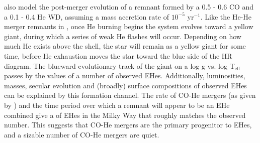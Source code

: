 
\cite{saioj02} also model the post-merger evolution of a remnant formed by a 0.5 - 0.6 {\Msun} CO and a 0.1 - 0.4 {\Msun} He WD, assuming a mass accretion rate of $10^{-5}$ {\Msun} yr$^{-1}$.  Like the He-He merger remnants in \cite{saioj00}, once He burning begins the system evolves toward a yellow giant, during which a series of weak He flashes will occur.  Depending on how much He exists above the shell, the star will remain as a yellow giant for some time, before He exhaustion moves the star toward the blue side of the HR diagram.  The blueward evolutionary track of the giant on a log g vs. log T$_{\mathrm{eff}}$ passes by the values of a number of observed EHes.  Additionally, luminosities, masses, secular evolution and (broadly) surface compositions of observed EHes can be explained by this formation channel.  The rate of CO-He mergers (as given by \cite{nele+01a}) and the time period over which a remnant will appear to be an EHe combined give a of EHes in the Milky Way that roughly matches the observed number.  This suggests that CO-He mergers are the primary progenitor to EHes, and a sizable number of CO-He mergers are quiet.



